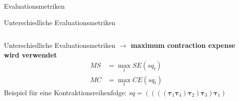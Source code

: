 \documentclass{beamer}
\begin{document}
\begin{section}{Evaluationsmetriken}
\begin{frame}{Unterschiedliche Evaluationsmetriken}
\begin{columns}
			\end{columns}
		\end{frame}

		\begin{frame}{Unterschiedliche Evaluationsmetriken}
			\textbf{$\rightarrow$ maximum contraction expense wird verwendet}
			\begin{align*}
				MS &= \max_t SE(sq_t)\\ MC &= \max_t CE(sq_t)
			\end{align*}
			Beispiel für eine Kontraktionsreihenfolge:
			$sq = ((((\bm{\tau}_{1} \bm{\tau}_{4}) \bm{\tau}_{2}) \bm{\tau}_{3}) \bm{\tau}_{1})$
		\end{frame}

	\end{section}
\end{document}
